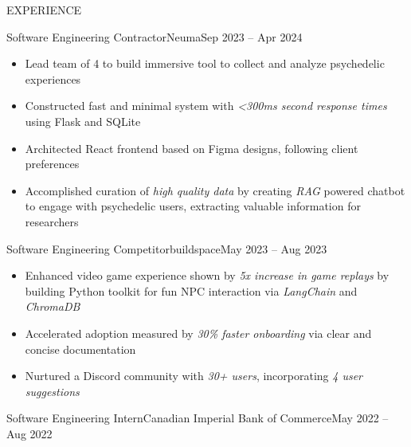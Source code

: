 \documentclass[]{mcdowellcv}
\begin{document}
\makeheader
    

\begin{cvsection}{EXPERIENCE}
	\begin{cvsubsection}{Software Engineering Contractor}{Neuma}{Sep 2023 -- Apr 2024}
		            
		\begin{itemize}%
			\item Lead team of 4 to build immersive tool to collect and analyze psychedelic experiences
			\item Constructed fast and minimal system with \textit{\textless{}300ms second response times} using Flask and SQLite
			\item Architected React frontend based on Figma designs, following client preferences
			\item Accomplished curation of \textit{high quality data} by creating \textit{RAG} powered chatbot to engage with psychedelic users, extracting valuable information for researchers
		\end{itemize}
	\end{cvsubsection}
	\begin{cvsubsection}{Software Engineering Competitor}{buildspace}{May 2023 -- Aug 2023}
		            
		\begin{itemize}%
			\item Enhanced video game experience shown by \textit{5x increase in game replays} by building Python toolkit for fun NPC interaction via \textit{LangChain} and \textit{ChromaDB}
			\item Accelerated adoption measured by \textit{30\% faster onboarding} via clear and concise documentation
			\item Nurtured a Discord community with \textit{30+ users}, incorporating \textit{4 user suggestions}
		\end{itemize}
	\end{cvsubsection}
	\begin{cvsubsection}{Software Engineering Intern}{Canadian Imperial Bank of Commerce}{May 2022 -- Aug 2022}
		            

\end{cvsubsection}
\end{cvsection}
\end{document}
